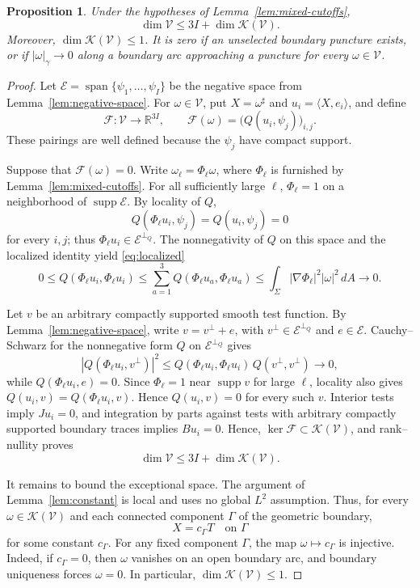 \documentclass[11pt]{amsart}
\numberwithin{equation}{section}
\newtheorem{proposition}[theorem]{Proposition}
\theoremstyle{definition}
\theoremstyle{remark}
\newcommand{\R}{\mathbb R}
\newcommand{\EE}{\mathcal E}
\newcommand{\KK}{\mathcal K}
\DeclareMathOperator{\supp}{supp}
\begin{document}
\begin{proposition}\label{prop:meromorphic-index}
Under the hypotheses of Lemma~\ref{lem:mixed-cutoffs},
\[
\dim\mathcal V\le3I+\dim\KK(\mathcal V).
\]
Moreover, $\dim\KK(\mathcal V)\le1$. It is zero if an unselected boundary puncture exists, or if $|\omega|_\gamma\to0$ along a boundary arc approaching a puncture for every $\omega\in\mathcal V$.
\end{proposition}
\begin{proof}
Let $\EE=\operatorname{span}\{\psi_1,\ldots,\psi_I\}$ be the negative
space from Lemma~\ref{lem:negative-space}. For
$\omega\in\mathcal V$, put $X=\omega^\sharp$ and
$u_i=\langle X,e_i\rangle$, and define
\[
\mathcal F:\mathcal V\longrightarrow\R^{3I},
\qquad
\mathcal F(\omega)=\bigl(Q(u_i,\psi_j)\bigr)_{i,j}.
\]
These pairings are well defined because the $\psi_j$ have compact
support.

Suppose that $\mathcal F(\omega)=0$. Write
$\omega_\ell=\Phi_\ell\omega$, where $\Phi_\ell$ is furnished by
Lemma~\ref{lem:mixed-cutoffs}. For all sufficiently large $\ell$,
$\Phi_\ell=1$ on a neighborhood of $\supp\EE$. By locality of $Q$,
\[
Q(\Phi_\ell u_i,\psi_j)=Q(u_i,\psi_j)=0
\]
for every $i,j$; thus $\Phi_\ell u_i\in\EE^{\perp_Q}$. The
nonnegativity of $Q$ on this space and the localized identity yield \eqref{eq:localized}
\[
0\le Q(\Phi_\ell u_i,\Phi_\ell u_i)
\le \sum_{a=1}^3 Q(\Phi_\ell u_a,\Phi_\ell u_a)
\le \int_\Sigma |\nabla\Phi_\ell|^2|\omega|^2\,dA
\longrightarrow 0.
\]

Let $v$ be an arbitrary compactly supported smooth test function.
By Lemma~\ref{lem:negative-space}, write
$v=v^\perp+e$, with $v^\perp\in\EE^{\perp_Q}$ and $e\in\EE$.
Cauchy--Schwarz for the nonnegative form $Q$ on $\EE^{\perp_Q}$
gives
\[
|Q(\Phi_\ell u_i,v^\perp)|^2
\le Q(\Phi_\ell u_i,\Phi_\ell u_i)\,Q(v^\perp,v^\perp)
\longrightarrow 0,
\]
while $Q(\Phi_\ell u_i,e)=0$. Since $\Phi_\ell=1$ near
$\supp v$ for large $\ell$, locality also gives
$Q(u_i,v)=Q(\Phi_\ell u_i,v)$. Hence $Q(u_i,v)=0$ for every such
$v$. Interior tests imply $Ju_i=0$, and integration by parts
against tests with arbitrary compactly supported boundary traces
implies $Bu_i=0$. Hence,
$\ker\mathcal F\subset\KK(\mathcal V)$, and rank--nullity proves
\[
\dim\mathcal V\le 3I+\dim\KK(\mathcal V).
\]

It remains to bound the exceptional space. The argument of
Lemma~\ref{lem:constant} is local and uses no global $L^2$
assumption. Thus, for every $\omega\in\KK(\mathcal V)$ and each
connected component $\Gamma$ of the geometric boundary,
\[
X=c_\Gamma T\quad\text{on }\Gamma
\]
for some constant $c_\Gamma$. For any fixed component $\Gamma$,
the map $\omega\mapsto c_\Gamma$ is injective. Indeed, if
$c_\Gamma=0$, then $\omega$ vanishes on an open boundary arc,
and boundary uniqueness forces $\omega=0$. In particular,
$\dim\KK(\mathcal V)\le1$.


\end{proof}
\end{document}
